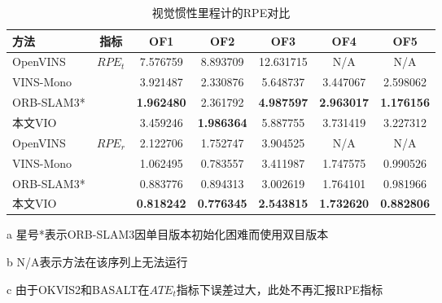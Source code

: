 \begin{table}
\centering
\begin{threeparttable}
\caption{视觉惯性里程计的RPE\textdownarrow{}对比}
\begin{tabular}{lcccccc}
\toprule
方法        & 指标                    & OF1               & OF2               & OF3               & OF4               & OF5               \\ \midrule
OpenVINS  & \multirow{4}{*}{$RPE_t$} & 7.576759          & 8.893709          & 12.631715         & N/A               & N/A               \\
VINS-Mono &                       & 3.921487          & 2.330876          & 5.648737          & 3.447067          & 2.598062          \\
ORB-SLAM3* &                       & \cellcolor[HTML]{FFCCC9}\textbf{1.962480} & 2.361792          & \cellcolor[HTML]{FFCCC9}\textbf{4.987597} & \cellcolor[HTML]{FFCCC9}\textbf{2.963017} & \cellcolor[HTML]{FFCCC9}\textbf{1.176156} \\
本文VIO      &                       & 3.459246          & \cellcolor[HTML]{FFCCC9}\textbf{1.986364} & 5.887755          & 3.731419          & 3.227312          \\ \midrule
OpenVINS  & \multirow{4}{*}{$RPE_r$} & 2.122706          & 1.752747          & 3.904525          & N/A               & N/A               \\
VINS-Mono &                       & 1.062495          & 0.783557          & 3.411987          & 1.747575          & 0.990526          \\
ORB-SLAM3* &                       & 0.883776          & 0.894313          & 3.002619          & 1.764101          & 0.981966          \\
本文VIO       &                       & \cellcolor[HTML]{FFCCC9}\textbf{0.818242} & \cellcolor[HTML]{FFCCC9}\textbf{0.776345} & \cellcolor[HTML]{FFCCC9}\textbf{2.543815} & \cellcolor[HTML]{FFCCC9}\textbf{1.732620} & \cellcolor[HTML]{FFCCC9}\textbf{0.882806} \\ \bottomrule
\end{tabular}
\label{tab:vio_rpe}
\begin{tablenotes}
  \item [a] 星号*表示ORB-SLAM3因单目版本初始化困难而使用双目版本
  \item [b] N/A表示方法在该序列上无法运行
  \item [c] 由于OKVIS2和BASALT在$ATE_t$指标下误差过大，此处不再汇报RPE指标
\end{tablenotes}
\end{threeparttable}
\end{table}


